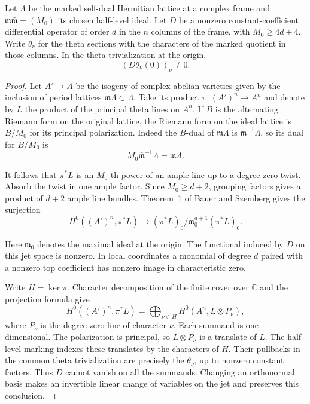 \begin{auxlemma}
\label{lem:ideal-lattice-jet}
Let \(\Lambda\) be the marked self-dual Hermitian lattice at a complex
frame and \(\mathfrak m\bar{\mathfrak m}=(M_0)\) its chosen half-level
ideal. Let \(D\) be a nonzero constant-coefficient differential operator
of order \(d\) in the \(n\) columns of the frame, with \(M_0\ge4d+4\).
Write \(\theta_\nu\) for the theta sections with the characters of the
marked quotient in those columns. In the theta trivialization at the
origin,
\[
             (D\theta_\nu(0))_\nu\ne0 .
\]
\end{auxlemma}
\begin{proof}
Let \(A'\to A\) be the isogeny of complex abelian varieties given by
the inclusion of period lattices \(\mathfrak m\Lambda\subset\Lambda\).
Take its product \(\pi:(A')^n\to A^n\) and denote by \(L\) the product
of the principal theta lines on \(A^n\). If \(B\) is the alternating
Riemann form on the original lattice, the Riemann form on the ideal
lattice is \(B/M_0\) for its principal polarization. Indeed the
\(B\)-dual of \(\mathfrak m\Lambda\) is
\(\bar{\mathfrak m}^{-1}\Lambda\), so its dual for \(B/M_0\) is
\[
        M_0\bar{\mathfrak m}^{-1}\Lambda=\mathfrak m\Lambda .
\]

It follows that \(\pi^*L\) is an \(M_0\)-th power of an ample line
up to a degree-zero twist. Absorb the twist in one ample factor.
Since \(M_0\ge d+2\), grouping factors gives a product of \(d+2\)
ample line bundles. Theorem~1 of Bauer and Szemberg gives the
surjection \cite{bauer-szemberg-jets}
\[
 H^0((A')^n,\pi^*L)\longrightarrow
 (\pi^*L)_0/\mathfrak m_0^{d+1}(\pi^*L)_0 .
\]

Here \(\mathfrak m_0\) denotes the maximal ideal at the origin.
The functional induced by \(D\) on this jet space is nonzero. In local
coordinates a monomial of degree \(d\) paired with a nonzero
top coefficient has nonzero image in characteristic zero.

Write \(H=\ker\pi\). Character decomposition of the finite cover
over \(\mathbb C\) and the projection formula give
\[
 H^0((A')^n,\pi^*L)
  =\bigoplus_{\nu\in\widehat H} H^0(A^n,L\otimes P_\nu),
\]
where \(P_\nu\) is the degree-zero line of character \(\nu\).
Each summand is one-dimensional. The polarization is principal,
so \(L\otimes P_\nu\) is a translate of \(L\). The half-level marking
indexes these translates by the characters of \(H\). Their pullbacks
in the common theta trivialization are precisely the \(\theta_\nu\),
up to nonzero constant factors. Thus \(D\) cannot vanish on all the
summands. Changing an orthonormal basis makes an invertible linear
change of variables on the jet and preserves this conclusion.
\end{proof}

